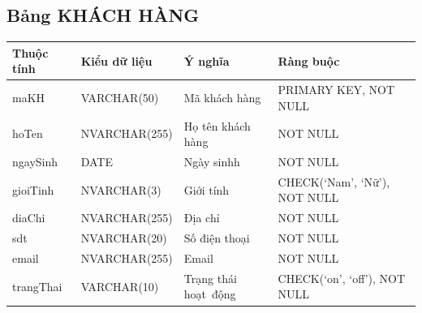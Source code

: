 \documentclass[a4paper,12pt]{report}
\begin{document}
\subsection{Bảng KHÁCH HÀNG}
\noindent
\begin{center}
    \begin{longtable}{|>{\centering\arraybackslash}p{3cm}|
        >{\centering\arraybackslash}p{4cm}|
        >{\centering\arraybackslash}p{4cm}|
        >{\centering\arraybackslash}p{4cm}|}
        \hline
        \textbf{Thuộc tính}                                                                                                               &
        \textbf{Kiểu dữ liệu}                                                                                                                             &
        \textbf{Ý nghĩa}                                                                                                 &
        \textbf{Ràng buộc}                                                                                                         \\
        \hline
        maKH &  VARCHAR(50)  & Mã khách hàng & PRIMARY KEY, NOT NULL \\
        \hline
        hoTen &  NVARCHAR(255)  & Họ tên khách hàng & NOT NULL \\                                                                                                                          
        \hline
        ngaySinh & DATE & Ngày sinhh & NOT NULL \\                                                                                                                          
        \hline
        gioiTinh & NVARCHAR(3) & Giới tính & CHECK(‘Nam’, ‘Nữ’), NOT NULL \\                                                                                                                          
        \hline
        diaChi & NVARCHAR(255) & Địa chỉ & NOT NULL \\                                                                                                                          
        \hline
        sdt & NVARCHAR(20) & Số điện thoại & NOT NULL \\                                                                                                                          
        \hline
        email & NVARCHAR(255) & Email & NOT NULL \\                                                                                                                          
        \hline
        trangThai &  VARCHAR(10)  & Trạng thái hoạt~động & CHECK(‘on’, ‘off’), NOT NULL \\
        \hline
    \end{longtable}
\end{center}
\end{document}

